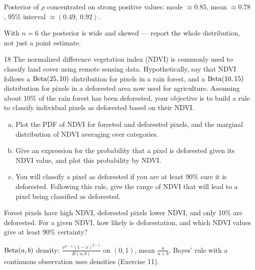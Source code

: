\documentclass[11pt]{article}
\begin{document}
\begin{answer}
Posterior of $\rho$ concentrated on strong positive values: mode $\approx0.85$, mean $\approx0.78$, 95\% interval $\approx(0.49,\ 0.92)$.
\end{answer}

\begin{takeaway}
With $n=6$ the posterior is wide and skewed --- report the whole distribution, not just a point estimate.
\end{takeaway}


\begin{problem}{18}
The normalized difference vegetation index (NDVI) is commonly used to classify land cover using remote sensing data. Hypothetically, say that NDVI follows a $\mathrm{Beta}(25,10)$ distribution for pixels in a rain forest, and a $\mathrm{Beta}(10,15)$ distribution for pixels in a deforested area now used for agriculture. Assuming about 10\% of the rain forest has been deforested, your objective is to build a rule to classify individual pixels as deforested based on their NDVI.
\begin{enumerate}[(a)]
\item Plot the PDF of NDVI for forested and deforested pixels, and the marginal distribution of NDVI averaging over categories.
\item Give an expression for the probability that a pixel is deforested given its NDVI value, and plot this probability by NDVI.
\item You will classify a pixel as deforested if you are at least 90\% sure it is deforested. Following this rule, give the range of NDVI that will lead to a pixel being classified as deforested.
\end{enumerate}
\end{problem}

\begin{restate}
Forest pixels have high NDVI, deforested pixels lower NDVI, and only 10\% are deforested. For a given NDVI, how likely is deforestation, and which NDVI values give at least 90\% certainty?
\end{restate}

\begin{recall}
$\mathrm{Beta}(a,b)$ density: $\frac{x^{a-1}(1-x)^{b-1}}{B(a,b)}$ on $(0,1)$, mean $\frac a{a+b}$. Bayes' rule with a continuous observation uses densities (Exercise 11).
\end{recall}
\end{document}

